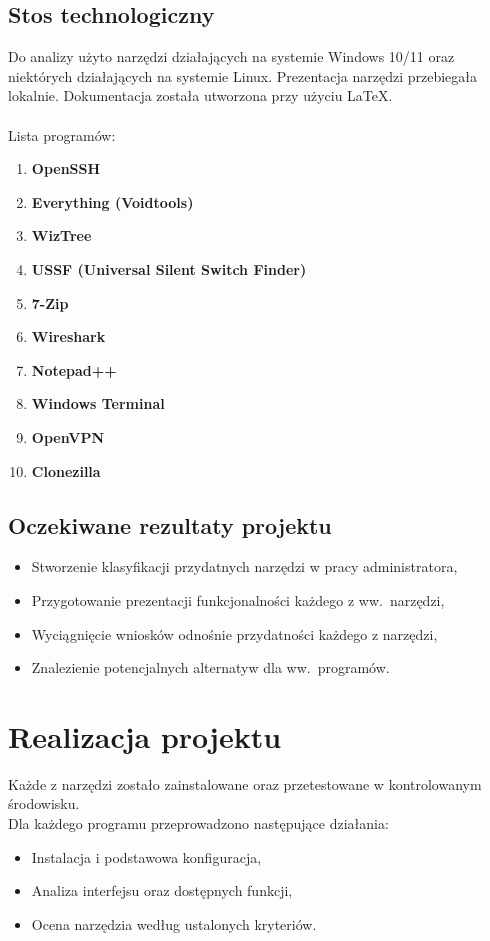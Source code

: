 \documentclass[0.82pt,a4paper]{article}
\begin{document}
\subsection{Stos technologiczny}
	Do analizy użyto narzędzi działających na systemie Windows 10/11 oraz niektórych działających na systemie Linux. 
    Prezentacja narzędzi przebiegała lokalnie. Dokumentacja została utworzona przy użyciu \LaTeX.
    \\\\
    Lista programów:
    \begin{enumerate}
        \item \textbf{OpenSSH}
        \item \textbf{Everything (Voidtools)}
        \item \textbf{WizTree}
        \item \textbf{USSF (Universal Silent Switch Finder)}
        \item \textbf{7-Zip}
        \item \textbf{Wireshark}
        \item \textbf{Notepad++}
        \item \textbf{Windows Terminal}
        \item \textbf{OpenVPN}
        \item \textbf{Clonezilla}
    \end{enumerate}

\subsection{Oczekiwane rezultaty projektu}
	\begin{itemize}
	    \item Stworzenie klasyfikacji przydatnych narzędzi w pracy administratora,
            \item Przygotowanie prezentacji funkcjonalności każdego z ww.\ narzędzi,
            \item Wyciągnięcie wniosków odnośnie przydatności każdego z narzędzi,
            \item Znalezienie potencjalnych alternatyw dla ww.\ programów.
	\end{itemize}

\newpage
\section{Realizacja projektu}
	Każde z narzędzi zostało zainstalowane oraz przetestowane w kontrolowanym środowisku.
    \\
    Dla każdego programu przeprowadzono następujące działania:
    \begin{itemize}
        \item Instalacja i podstawowa konfiguracja,
        \item Analiza interfejsu oraz dostępnych funkcji,
        \item Ocena narzędzia według ustalonych kryteriów.
    \end{itemize}
\end{document}
